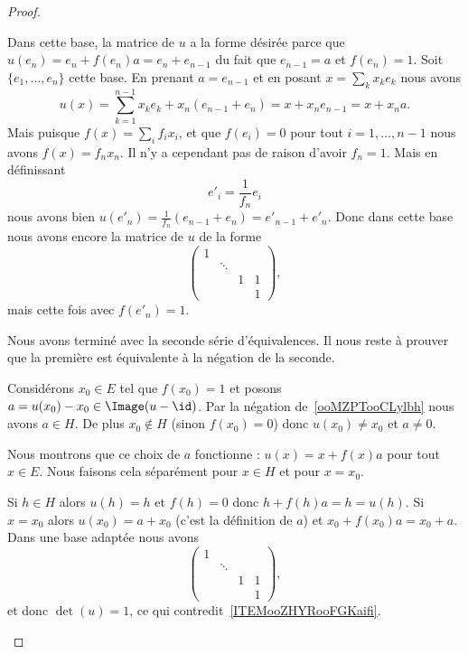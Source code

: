 \begin{proof}
\begin{subproof}
		Dans cette base, la matrice de \( u\) a la forme désirée parce que \( u(e_n)=e_n+f(e_n)a=e_n+e_{n-1}\) du fait que \( e_{n-1}=a\) et \( f(e_n)=1\).
		Soit \( \{ e_1,\ldots, e_n \}\) cette base. En prenant \( a=e_{n-1}\) et en posant \( x=\sum_kx_ke_k\) nous avons
		\begin{equation}
			u(x)=\sum_{k=1}^{n-1}x_ke_k+x_n(e_{n-1}+e_n)=x+x_ne_{n-1}=x+x_na.
		\end{equation}
		Mais puisque \( f(x)=\sum_if_ix_i\), et que \( f(e_i)=0\) pour tout \( i=1,\ldots, n-1\) nous avons \( f(x)=f_nx_n\). Il n'y a cependant pas de raison d'avoir \( f_n=1\). Mais en définissant
		\begin{equation}
			e'_i=\frac{1}{ f_n }e_i
		\end{equation}
		nous avons bien \( u(e'_n)=\frac{1}{ f_n }(e_{n-1}+e_n)=e'_{n-1}+e'_n\). Donc dans cette base nous avons encore la matrice de \( u\) de la forme
		\begin{equation}
			\begin{pmatrix}
				1 &        &   &   \\
				  & \ddots &   &   \\
				  &        & 1 & 1 \\
				  &        &   & 1
			\end{pmatrix},
		\end{equation}
		mais cette fois avec \( f(e'_n)=1\).
	\end{subproof}
	Nous avons terminé avec la seconde série d'équivalences. Il nous reste à prouver que la première est équivalente à la négation de la seconde.
	\begin{subproof}
		Considérons \( x_0\in E\) tel que \( f(x_0)=1\) et posons \( a=u(x_0)-x_0\in\Image(u-\id)\). Par la négation de~\ref{ooMZPTooCLylbh} nous avons \( a\in H\). De plus \( x_0\notin H\) (sinon \( f(x_0)=0\)) donc \( u(x_0)\neq x_0\) et \( a\neq 0\).

		Nous montrons que ce choix de \( a\) fonctionne : \( u(x)=x+f(x)a\) pour tout \( x\in E\). Nous faisons cela séparément pour \( x\in H\) et pour \( x=x_0\).

		Si \( h\in H\) alors \( u(h)=h\) et \( f(h)=0\) donc \( h+f(h)a=h=u(h)\). Si \( x=x_0\) alors \( u(x_0)=a+x_0\) (c'est la définition de \( a\)) et \( x_0+f(x_0)a=x_0+a\).
		Dans une base adaptée nous avons
		\begin{equation}
			\begin{pmatrix}
				1 &        &   &   \\
				  & \ddots &   &   \\
				  &        & 1 & 1 \\
				  &        &   & 1
			\end{pmatrix},
		\end{equation}
		et donc \( \det(u)=1\), ce qui contredit~\ref{ITEMooZHYRooFGKaifi}.
	\end{subproof}
\end{proof}


